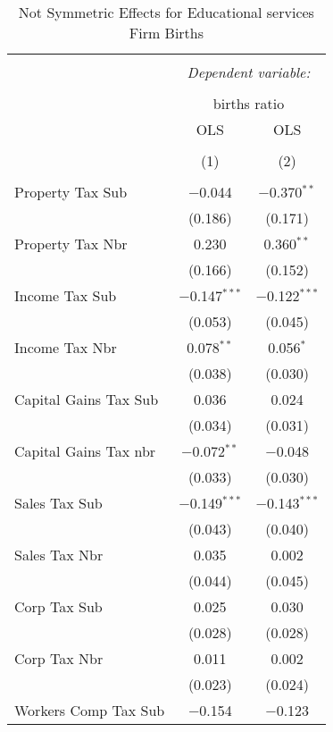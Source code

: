 
\begin{table}[!htbp] \centering 
  \caption{Not Symmetric Effects for  Educational services Firm Births} 
  \label{61noequality} 
\footnotesize 
\begin{tabular}{@{\extracolsep{5pt}}lcc} 
\\[-1.8ex]\hline 
\hline \\[-1.8ex] 
 & \multicolumn{2}{c}{\textit{Dependent variable:}} \\ 
\cline{2-3} 
\\[-1.8ex] & \multicolumn{2}{c}{births ratio} \\ 
 & OLS & OLS \\ 
\\[-1.8ex] & (1) & (2)\\ 
\hline \\[-1.8ex] 
 Property Tax Sub & $-$0.044 & $-$0.370$^{**}$ \\ 
  & (0.186) & (0.171) \\ 
  Property Tax Nbr & 0.230 & 0.360$^{**}$ \\ 
  & (0.166) & (0.152) \\ 
  Income Tax Sub & $-$0.147$^{***}$ & $-$0.122$^{***}$ \\ 
  & (0.053) & (0.045) \\ 
  Income Tax Nbr & 0.078$^{**}$ & 0.056$^{*}$ \\ 
  & (0.038) & (0.030) \\ 
  Capital Gains Tax Sub & 0.036 & 0.024 \\ 
  & (0.034) & (0.031) \\ 
  Capital Gains Tax nbr & $-$0.072$^{**}$ & $-$0.048 \\ 
  & (0.033) & (0.030) \\ 
  Sales Tax Sub & $-$0.149$^{***}$ & $-$0.143$^{***}$ \\ 
  & (0.043) & (0.040) \\ 
  Sales Tax Nbr & 0.035 & 0.002 \\ 
  & (0.044) & (0.045) \\ 
  Corp Tax Sub & 0.025 & 0.030 \\ 
  & (0.028) & (0.028) \\ 
  Corp Tax Nbr & 0.011 & 0.002 \\ 
  & (0.023) & (0.024) \\ 
  Workers Comp Tax Sub & $-$0.154 & $-$0.123 \\ 

\end{tabular}
\end{table}
